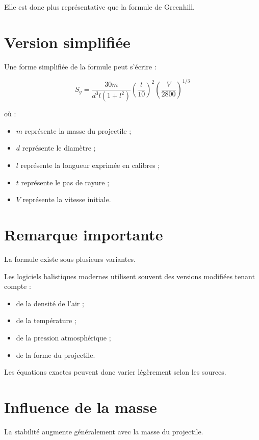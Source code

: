 Elle est donc plus représentative que la formule de Greenhill.

\section{Version simplifiée}

Une forme simplifiée de la formule peut s'écrire :

\begin{equation}
S_g=
\frac{30m}
     {d^3l(1+l^2)}
\left(\frac{t}{10}\right)^2
\left(\frac{V}{2800}\right)^{1/3}
\end{equation}

où :

\begin{itemize}
    \item $m$ représente la masse du projectile ;
    \item $d$ représente le diamètre ;
    \item $l$ représente la longueur exprimée en calibres ;
    \item $t$ représente le pas de rayure ;
    \item $V$ représente la vitesse initiale.
\end{itemize}

\section{Remarque importante}

La formule existe sous plusieurs variantes.

Les logiciels balistiques modernes utilisent souvent des versions modifiées
tenant compte :

\begin{itemize}
    \item de la densité de l'air ;
    \item de la température ;
    \item de la pression atmosphérique ;
    \item de la forme du projectile.
\end{itemize}

Les équations exactes peuvent donc varier légèrement selon les sources.

\section{Influence de la masse}

La stabilité augmente généralement avec la masse du projectile.

